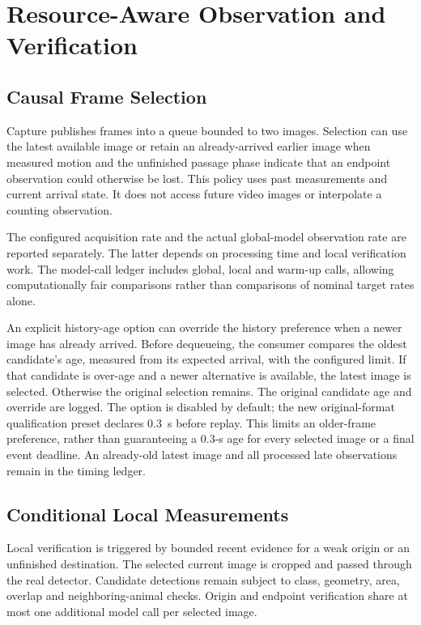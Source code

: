 \documentclass[journal]{IEEEtran}
\begin{document}
\section{Resource-Aware Observation and Verification}
\subsection{Causal Frame Selection}
Capture publishes frames into a queue bounded to two images. Selection can use the latest available image or retain an already-arrived earlier image when measured motion and the unfinished passage phase indicate that an endpoint observation could otherwise be lost. This policy uses past measurements and current arrival state. It does not access future video images or interpolate a counting observation.

The configured acquisition rate and the actual global-model observation rate are reported separately. The latter depends on processing time and local verification work. The model-call ledger includes global, local and warm-up calls, allowing computationally fair comparisons rather than comparisons of nominal target rates alone.

An explicit history-age option can override the history preference when a newer image has already arrived. Before dequeueing, the consumer compares the oldest candidate's age, measured from its expected arrival, with the configured limit. If that candidate is over-age and a newer alternative is available, the latest image is selected. Otherwise the original selection remains. The original candidate age and override are logged. The option is disabled by default; the new original-format qualification preset declares 0.3~s before replay. This limits an older-frame preference, rather than guaranteeing a 0.3-s age for every selected image or a final event deadline. An already-old latest image and all processed late observations remain in the timing ledger.

\subsection{Conditional Local Measurements}
Local verification is triggered by bounded recent evidence for a weak origin or an unfinished destination. The selected current image is cropped and passed through the real detector. Candidate detections remain subject to class, geometry, area, overlap and neighboring-animal checks. Origin and endpoint verification share at most one additional model call per selected image.
\end{document}
